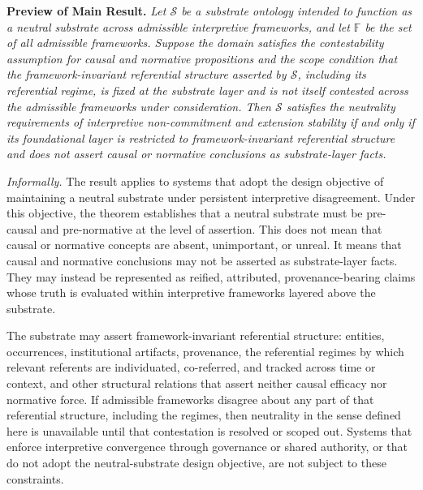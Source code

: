 \documentclass[11pt]{article}
\theoremstyle{plain}
\theoremstyle{definition}
\theoremstyle{remark}
\begin{document}

\bigskip
\noindent\textbf{Preview of Main Result.}
\emph{Let $\mathcal{S}$ be a substrate ontology intended to function
  as a neutral substrate across admissible interpretive frameworks,
  and let $\mathbb{F}$ be the set of all admissible frameworks.
  Suppose the domain satisfies the contestability assumption for causal
  and normative propositions and the scope condition that the
  framework-invariant referential structure asserted by $\mathcal{S}$,
including its referential regime, is fixed at the substrate layer
and is not itself contested
across the admissible frameworks under consideration.
  Then $\mathcal{S}$ satisfies the neutrality requirements
  of interpretive non-commitment and extension stability
  if and only if its foundational layer is restricted to
  framework-invariant referential structure and does not assert causal
  or normative conclusions as substrate-layer facts.}

\medskip
\noindent
\emph{Informally.}
The result applies to systems that adopt the design objective
of maintaining a neutral substrate under persistent interpretive disagreement.
Under this objective, the theorem establishes that a neutral substrate must be
pre-causal and pre-normative at the level of assertion.
This does not mean that causal or normative concepts are
absent, unimportant, or unreal.
It means that causal and normative conclusions may not be asserted
as substrate-layer facts.
They may instead be represented as reified, attributed,
provenance-bearing claims whose truth is evaluated within
interpretive frameworks layered above the substrate.

\medskip
\noindent
The substrate may assert framework-invariant referential structure:
entities, occurrences, institutional artifacts, provenance,
the referential regimes by which relevant referents are individuated,
co-referred, and tracked across time or context,
and other structural relations that assert neither causal efficacy
nor normative force.
If admissible frameworks disagree about any part of that referential
structure, including the regimes, then neutrality in the
sense defined here is unavailable until that contestation is resolved
or scoped out.
Systems that enforce interpretive convergence through governance or shared
authority, or that do not adopt the neutral-substrate design objective,
are not subject to these constraints.
\end{document}
